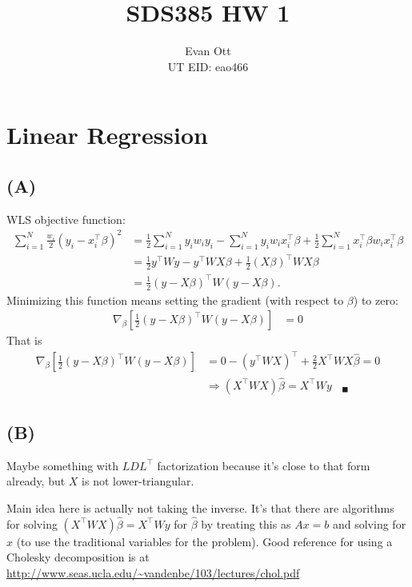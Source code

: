 \documentclass{article}
\title{\vspace{-6ex}SDS385 HW 1\vspace{-2ex}}
\author{Evan Ott \\ UT EID: eao466\vspace{-2ex}}
\begin{document}
\maketitle
\section{Linear Regression}
\subsection{(A)}
WLS objective function:
\begin{align*}
\sum_{i=1}^N\frac{w_i}{2}(y_i-x_i^\top\beta)^2&=\frac{1}{2}\sum_{i=1}^Ny_iw_iy_i - \sum_{i=1}^Ny_iw_ix_i^\top\beta+\frac{1}{2}\sum_{i=1}^Nx_i^\top\beta w_ix_i^\top\beta\\
&=\frac{1}{2}y^\top W y - y^\top W X \beta + \frac{1}{2}(X\beta)^\top WX\beta\\
&=\frac{1}{2}(y-X\beta)^\top W(y-X\beta).
\end{align*}
Minimizing this function means setting the gradient (with respect to $\beta$) to zero:
\begin{align*}
\nabla_\beta\left[\frac{1}{2}(y-X\beta)^\top W(y-X\beta)\right]&=0
\end{align*}
That is
\begin{align*}
\nabla_\beta\left[\frac{1}{2}(y-X\beta)^\top W(y-X\beta)\right]&=0-(y^\top WX)^\top+\frac{2}{2}X^\top WX\hat{\beta}=0\\
&\Rightarrow (X^\top WX)\hat{\beta}=X^\top Wy~~~~_\blacksquare
\end{align*}

\subsection{(B)}
Maybe something with $LDL^\top$ factorization because it's close to that form already, but $X$ is not lower-triangular.

Main idea here is actually not taking the inverse. It's that there are algorithms for solving $(X^\top WX)\hat{\beta}=X^\top Wy$ for $\hat{\beta}$ by treating this as $Ax=b$ and solving for $x$ (to use the traditional variables for the problem).
Good reference for using a Cholesky decomposition is at \url{http://www.seas.ucla.edu/~vandenbe/103/lectures/chol.pdf}
\end{document}
